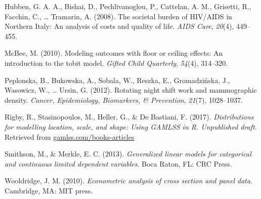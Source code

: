 \documentclass[english,man]{apa6}
\theoremstyle{definition}
\theoremstyle{definition}
\theoremstyle{remark}
\begin{document}
\hypertarget{ref-hubben2008societal}{}
Hubben, G. A. A., Bishai, D., Pechlivanoglou, P., Cattelan, A. M.,
Grisetti, R., Facchin, C., \ldots{} Tramarin, A. (2008). The societal
burden of HIV/AIDS in Northern Italy: An analysis of costs and quality
of life. \emph{AIDS Care}, \emph{20}(4), 449--455.

\hypertarget{ref-mcbee2010modeling}{}
McBee, M. (2010). Modeling outcomes with floor or ceiling effects: An
introduction to the tobit model. \emph{Gifted Child Quarterly},
\emph{54}(4), 314--320.

\hypertarget{ref-peplonska2012rotating}{}
Peplonska, B., Bukowska, A., Sobala, W., Reszka, E., Gromadzińska, J.,
Wasowicz, W., \ldots{} Ursin, G. (2012). Rotating night shift work and
mammographic density. \emph{Cancer, Epidemiology, Biomarkers, \&
Prevention}, \emph{21}(7), 1028--1037.

\hypertarget{ref-rigby2017distributions}{}
Rigby, R., Stasinopoulos, M., Heller, G., \& De Bastiani, F. (2017).
\emph{Distributions for modelling location, scale, and shape: Using
GAMLSS in R. Unpublished draft}. Retrieved from
\url{gamlss.com/books-articles}

\hypertarget{ref-smithson2013generalized}{}
Smithson, M., \& Merkle, E. C. (2013). \emph{Generalized linear models
for categorical and continuous limited dependent variables}. Boca Raton,
FL: CRC Press.

\hypertarget{ref-wooldridge2010econometric}{}
Wooldridge, J. M. (2010). \emph{Econometric analysis of cross section
and panel data}. Cambridge, MA: MIT press.
\end{document}
